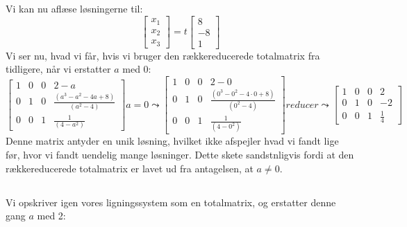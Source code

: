 \documentclass[a4paper,12pt]{article}
\begin{document}
Vi kan nu aflæse løsningerne til:
\[
\left[\begin{array}{c}
    x_1 \\
    x_2 \\
    x_3
\end{array}\right]
=
t
\left[\begin{array}{c}
    8 \\
    -8 \\
    1
\end{array}\right]
\]
Vi ser nu, hvad vi får, hvis vi bruger den rækkereducerede totalmatrix fra tidligere, når vi erstatter $a$ med 0:\\

$
\left[\begin{array}{ccc|c}
    1 & 0 & 0 & 2-a \\
    0 & 1 & 0 & \frac{(a^3 - a^2 - 4a + 8)}{(a^2 - 4)} \\
    0 & 0 & 1 & \frac{1}{(4-a^2)}
\end{array}\right]
a=0
\leadsto
\left[\begin{array}{ccc|c}
    1 & 0 & 0 & 2-0 \\
    0 & 1 & 0 & \frac{(0^3 - 0^2 - 4\cdot0 + 8)}{(0^2 - 4)} \\
    0 & 0 & 1 & \frac{1}{(4-0^2)}
\end{array}\right]
reducer
\leadsto
\left[\begin{array}{ccc|c}
    1 & 0 & 0 & 2 \\
    0 & 1 & 0 & -2 \\
    0 & 0 & 1 & \frac{1}{4}
\end{array}\right]
$\\

Denne matrix antyder en unik løsning, hvilket ikke afspejler hvad vi fandt lige før, hvor vi fandt uendelig mange løsninger. Dette skete sandstnligvis fordi at den rækkereducerede totalmatrix er lavet ud fra antagelsen, at $a \neq 0$.

\subsection{}
Vi opskriver igen vores ligningssystem som en totalmatrix, og erstatter denne gang $a$ med 2:\\
\end{document}
